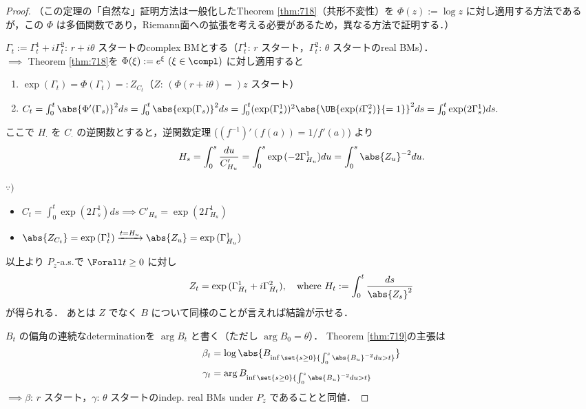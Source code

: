 \documentclass{jsarticle}
\begin{document}
\begin{proof}
    （この定理の「自然な」証明方法は一般化したTheorem \ref{thm:718}（共形不変性）を $\Phi(z):=\log z$ に対し適用する方法であるが，この $\Phi$ は多価関数であり，Riemann面への拡張を考える必要があるため，異なる方法で証明する．）

    $\Gamma_t:=\Gamma_t^1+i\Gamma_t^2$: $r+i\theta$ スタートのcomplex BMとする（$\Gamma_t^1$: $r$ スタート，$\Gamma_t^2$: $\theta$ スタートのreal BMs）．\\
    $\implies $ Theorem \ref{thm:718}を $\Phi(\xi):=e^{\xi}\ (\xi\in\compl)$ に対し適用すると
    \begin{enumerate}[label=(\roman*)]
        \item
        $\exp({\Gamma_t})=\Phi(\Gamma_t)=:Z_{C_t}$（$Z$: $(\Phi(r+i\theta)=)z$ スタート）
        \item
        $C_t=\int_0^t\abs{\Phi'(\Gamma_s)}^2ds=\int_0^t\abs{\exp({\Gamma_s})}^2ds=\int_0^t(\exp({\Gamma_s^1}))^2\abs{\UB{\exp({i\Gamma_s^2})}{=1}}^2ds=\int_0^t\exp({2\Gamma_s^1})ds.$
    \end{enumerate}

    ここで $H_{\cdot}$ を $C_{\cdot}$ の逆関数とすると，逆関数定理 ($(f^{-1})'(f(a))=1/f'(a)$) より
    \begin{align}
        H_s
        = \int_0^s\frac{du}{C'_{H_u}}
        = \int_0^s\exp{(-2\Gamma_{H_u}^1)}du
        = \int_0^s\abs{Z_u}^{-2}du.
    \end{align}

    \begin{screen}
        $\because)$
        \begin{itemize}
            \item 
            $C_t=\int_0^t\exp({2\Gamma_s^1})ds\implies C'_{H_u}=\exp({2\Gamma_{H_u}^1})$
            \item             $\abs{Z_{C_t}}=\exp{(\Gamma_t^1)}\xrightarrow{t=H_u}\abs{Z_u}=\exp{(\Gamma_{H_u}^1)}$
        \end{itemize}
    \end{screen}

    以上より $P_z$-a.s.で $\Forall t\ge0$ に対し
    $$
    Z_t=\exp{(\Gamma_{H_t}^1+i\Gamma_{H_t}^2)},\quad
    \text{where }H_t:=\int_0^t\frac{ds}{\abs{Z_s}^2}
    $$
    が得られる．
    あとは $Z$ でなく $B$ について同様のことが言えれば結論が示せる．

    $B_t$ の偏角の連続なdetermination\nazo を $\arg B_t$ と書く（ただし $\arg B_0=\theta$）．
    Theorem \ref{thm:719}の主張は
    \begin{align}
        \beta_t
        &= \log\abs{B_{\inf\set{s\ge0}{\int_0^s\abs{B_u}^{-2}du>t}}} \\
        \gamma_t
        &= \arg B_{\inf\set{s\ge0}{\int_0^s\abs{B_u}^{-2}du>t}}
    \end{align}
    $\implies \beta$: $r$ スタート，$\gamma$: $\theta$ スタートのindep. real BMs under $P_z$ であることと同値．


\end{proof}
\end{document}
